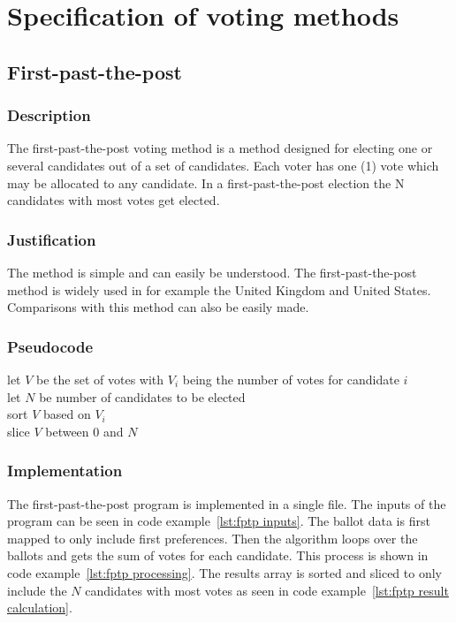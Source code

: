 \documentclass[12pt]{article}
\begin{document}
\section{Specification of voting methods}
\subsection{First-past-the-post}
\subsubsection{Description}
The first-past-the-post voting method is a method designed for electing one or several candidates out of a set of candidates. Each voter has one (1) vote which may be allocated to any candidate. In a first-past-the-post election the N candidates with most votes get elected.
\subsubsection{Justification}
The method is simple and can easily be understood. The first-past-the-post method is widely used in for example the United Kingdom and United States. Comparisons with this method can also be easily made.
\subsubsection{Pseudocode}
let $V$ be the set of votes with $V_{i}$ being the number of votes for candidate $i$ \\
let $N$ be number of candidates to be elected \\
sort $V$ based on $V_{i}$\\
slice $V$ between $0$ and $N$
\subsubsection{Implementation}
The first-past-the-post program is implemented in a single file. The inputs of the program can be seen in code example~\ref{lst:fptp inputs}.
The ballot data is first mapped to only include first preferences. Then the algorithm loops over the ballots and gets the sum of votes for each candidate. This process is shown in code example~\ref{lst:fptp processing}.
The results array is sorted and sliced to only include the $N$ candidates with most votes as seen in code example~\ref{lst:fptp result calculation}.
\end{document}
